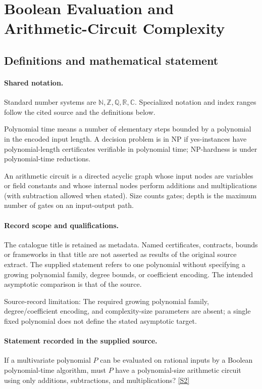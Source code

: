 \documentclass[11pt]{article}
\newcommand{\sref}[2]{\hyperlink{source:#1:#2}{[S#2]}}
\begin{document}
\section{Boolean Evaluation and Arithmetic-Circuit Complexity}\label{statement}

\subsection{Definitions and mathematical statement}

\paragraph{Shared notation.}Standard number systems are $\mathbb N,\mathbb Z,\mathbb Q,\mathbb R,\mathbb C$. Specialized notation and index ranges follow the cited source and the definitions below.


Polynomial time means a number of elementary steps bounded by a polynomial in the encoded input length. A decision problem is in $\mathrm{NP}$ if yes-instances have polynomial-length certificates verifiable in polynomial time; NP-hardness is under polynomial-time reductions.

An arithmetic circuit is a directed acyclic graph whose input nodes are variables or field constants and whose internal nodes perform additions and multiplications (with subtraction allowed when stated). Size counts gates; depth is the maximum number of gates on an input-output path.
\paragraph{Record scope and qualifications.}
The catalogue title is retained as metadata. Named certificates, contracts, bounds or frameworks in that title are not asserted as results of the original source extract.
The supplied statement refers to one polynomial without specifying a growing polynomial family, degree bounds, or coefficient encoding. The intended asymptotic comparison is that of the source.

Source-record limitation: The required growing polynomial family, degree/coefficient encoding, and complexity-size parameters are absent; a single fixed polynomial does not define the stated asymptotic target.
\paragraph{Statement recorded in the supplied source.}
If a multivariate polynomial $P$ can be evaluated on rational inputs by a Boolean polynomial-time algorithm, must $P$ have a polynomial-size arithmetic circuit using only additions, subtractions, and multiplications? \sref{statement}{2}
\end{document}
